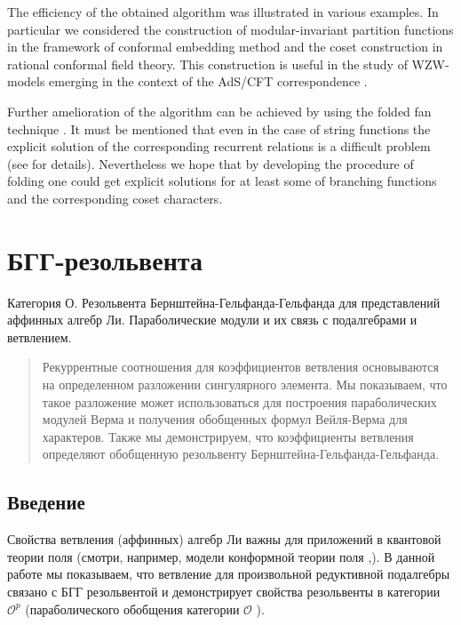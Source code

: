 The efficiency of the obtained algorithm was illustrated in various examples.
In particular we considered the construction of modular-invariant partition functions
in the framework of conformal embedding method and the coset construction in rational conformal field theory.
This construction is useful in the study of WZW-models
emerging in the context of the AdS/CFT correspondence \cite{Maldacena:2000hw,Maldacena:2000kv,Maldacena:2001km}.

Further amelioration of the algorithm can be achieved by using
the folded fan technique \cite{il2010folded}. It must be mentioned that even in the case
of string functions the explicit solution of the corresponding recurrent relations is
a difficult problem (see \cite{il2010folded} for details). Nevertheless we hope that by
developing the procedure of folding one could get explicit solutions
for at least some of branching functions and the corresponding coset characters.




\section{БГГ-резольвента}
\label{sec:bgg}
Категория О.
Резольвента Бернштейна-Гельфанда-Гельфанда для представлений аффинных алгебр Ли. Параболические модули и их связь с подалгебрами и ветвлением.


\begin{abstract}
Рекуррентные соотношения для коэффициентов ветвления основываются на определенном разложении сингулярного элемента. Мы показываем, что такое разложение может использоваться для построения параболических модулей Верма и получения обобщенных формул Вейля-Верма для характеров. Также мы демонстрируем, что коэффициенты ветвления определяют обобщенную резольвенту Бернштейна-Гельфанда-Гельфанда. 
\end{abstract}

\subsection{Введение}

\label{sec:introduction}
Свойства ветвления (аффинных) алгебр Ли важны для приложений в квантовой теории поля (смотри, например, модели конформной теории поля \cite{difrancesco1997cft},\cite{coquereaux2008conformal}). В данной работе мы показываем, что ветвление для произвольной редуктивной подалгебры связано с БГГ резольвентой и демонстрирует свойства резольвенты в категории $\mathcal{O}^{p}$ \cite{lepowsky1977generalization} (параболического обобщения категории $\mathcal{O}$ \cite{bernstein1976category}).

